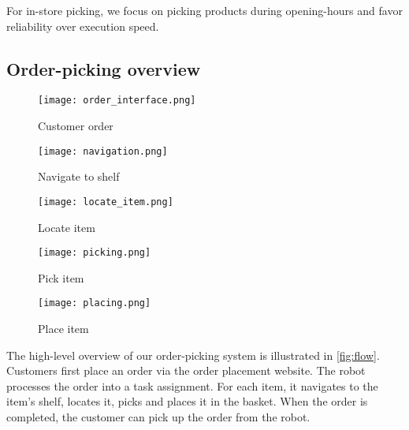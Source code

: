 For in\hyp{}store picking, we focus on picking products
during opening\hyp{}hours and favor reliability over execution speed. 



\subsection{Order\hyp{}picking overview}
\label{sec:order_system_overview}



\begin{figure*}[ht]
  \centering
  \begin{subfigure}[b]{0.18\linewidth}
    \centering
    \texttt{[image: order\_interface.png]}
    \caption{Customer order}
  \end{subfigure}%
  \begin{subfigure}[b]{0.18\linewidth}
    \centering
    \texttt{[image: navigation.png]}
    \caption{Navigate to shelf}
  \end{subfigure}
  \begin{subfigure}[b]{0.18\linewidth}
    \centering
    \texttt{[image: locate\_item.png]}
    \caption{Locate item}
  \end{subfigure}
  \begin{subfigure}[b]{0.18\linewidth}
    \centering
    \texttt{[image: picking.png]}
    \caption{Pick item}
  \end{subfigure}
  \begin{subfigure}[b]{0.18\linewidth}
    \centering
    \texttt{[image: placing.png]}
    \caption{Place item}
  \end{subfigure}
  \caption{Overview of ideal flow of symbolic actions to complete an order.}
  \label{fig:flow}
\end{figure*}


%
The high\hyp{}level overview of our order\hyp{}picking system is
illustrated in \cref{fig:flow}.
Customers first place an order via the order placement website. 
The robot processes the order into a task assignment. 
For each item, it navigates to the item's shelf, locates it, picks and places it in the basket.
When the order is completed, the customer can pick up the order from the robot.





